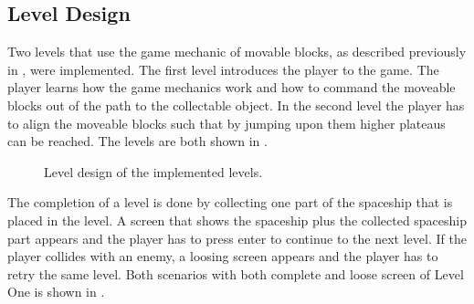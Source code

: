 \subsection{Level Design}\label{sec:game_design_level}
Two levels that use the game mechanic of movable blocks, as described previously in , were implemented.
The first level introduces the player to the game.
The player learns how the game mechanics work and how to command the moveable blocks out of the path to the collectable object.
In the second level the player has to align the moveable blocks such that by jumping upon them higher plateaus can be reached.
The levels are both shown in .
\begin{figure}[!ht]
  \centering
  \quad
  \caption{Level design of the implemented levels.}
  \label{fig:game_design_level}
\end{figure}
\FloatBarrier
\noindent
The completion of a level is done by collecting one part of the spaceship that is placed in the level.
A screen that shows the spaceship plus the collected spaceship part appears and the player has to press enter to continue to the next level.
If the player collides with an enemy, a loosing screen appears and the player has to retry the same level.
Both scenarios with both complete and loose screen of Level One is shown in .
